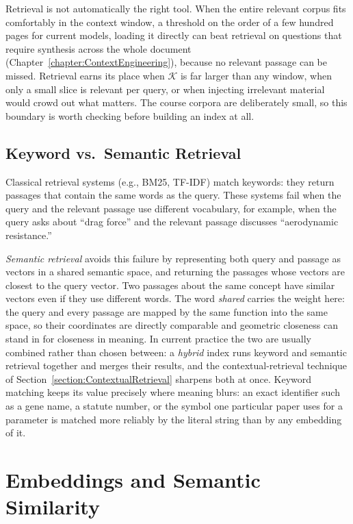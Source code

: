 \begin{remark}
Retrieval is not automatically the right tool.
When the entire relevant corpus fits comfortably in the context window, a threshold on the order of a few hundred pages for current models, loading it directly can beat retrieval on questions that require synthesis across the whole document (Chapter~\ref{chapter:ContextEngineering}), because no relevant passage can be missed.
Retrieval earns its place when $\mathcal{K}$ is far larger than any window, when only a small slice is relevant per query, or when injecting irrelevant material would crowd out what matters.
The course corpora are deliberately small, so this boundary is worth checking before building an index at all.
\end{remark}

\subsection{Keyword vs.\ Semantic Retrieval}

Classical retrieval systems (e.g., BM25, TF-IDF) match keywords: they return passages that contain the same words as the query.
These systems fail when the query and the relevant passage use different vocabulary, for example, when the query asks about ``drag force'' and the relevant passage discusses ``aerodynamic resistance.''

\emph{Semantic retrieval} avoids this failure by representing both query and passage as vectors in a shared semantic space, and returning the passages whose vectors are closest to the query vector.
Two passages about the same concept have similar vectors even if they use different words.
The word \emph{shared} carries the weight here: the query and every passage are mapped by the same function into the same space, so their coordinates are directly comparable and geometric closeness can stand in for closeness in meaning.
In current practice the two are usually combined rather than chosen between: a \emph{hybrid} index runs keyword and semantic retrieval together and merges their results, and the contextual-retrieval technique of Section~\ref{section:ContextualRetrieval} sharpens both at once.
Keyword matching keeps its value precisely where meaning blurs: an exact identifier such as a gene name, a statute number, or the symbol one particular paper uses for a parameter is matched more reliably by the literal string than by any embedding of it.

\section{Embeddings and Semantic Similarity}
\label{section:Embeddings}

